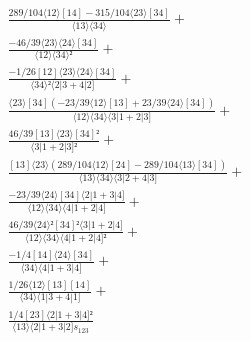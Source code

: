 \documentclass[varwidth, border=5pt]{standalone}
\begin{document}
\begin{my}
$\begin{gathered}
\scriptscriptstyle\frac{289/104⟨12⟩[14]-315/104⟨23⟩[34]}{⟨13⟩⟨34⟩} +\\
\scriptscriptstyle\frac{-46/39⟨23⟩⟨24⟩[34]}{⟨12⟩⟨34⟩²} +\\
\scriptscriptstyle\frac{-1/26[12]⟨23⟩⟨24⟩[34]}{⟨34⟩²⟨2|3+4|2]} +\\
\scriptscriptstyle\frac{⟨23⟩[34](-23/39⟨12⟩[13]+23/39⟨24⟩[34])}{⟨12⟩⟨34⟩⟨3|1+2|3]} +\\
\scriptscriptstyle\frac{46/39[13]⟨23⟩[34]²}{⟨3|1+2|3]²} +\\
\scriptscriptstyle\frac{[13]⟨23⟩(289/104⟨12⟩[24]-289/104⟨13⟩[34])}{⟨13⟩⟨34⟩⟨3|2+4|3]} +\\
\scriptscriptstyle\frac{-23/39⟨24⟩[34]⟨2|1+3|4]}{⟨12⟩⟨34⟩⟨4|1+2|4]} +\\
\scriptscriptstyle\frac{46/39⟨24⟩²[34]²⟨3|1+2|4]}{⟨12⟩⟨34⟩⟨4|1+2|4]²} +\\
\scriptscriptstyle\frac{-1/4[14]⟨24⟩[34]}{⟨34⟩⟨4|1+3|4]} +\\
\scriptscriptstyle\frac{1/26⟨12⟩[13][14]}{⟨34⟩⟨1|3+4|1]} +\\
\scriptscriptstyle\frac{1/4[23]⟨2|1+3|4]²}{⟨13⟩⟨2|1+3|2]s_{123}} \phantom{+}
\end{gathered}$
\end{my}
\end{document}
